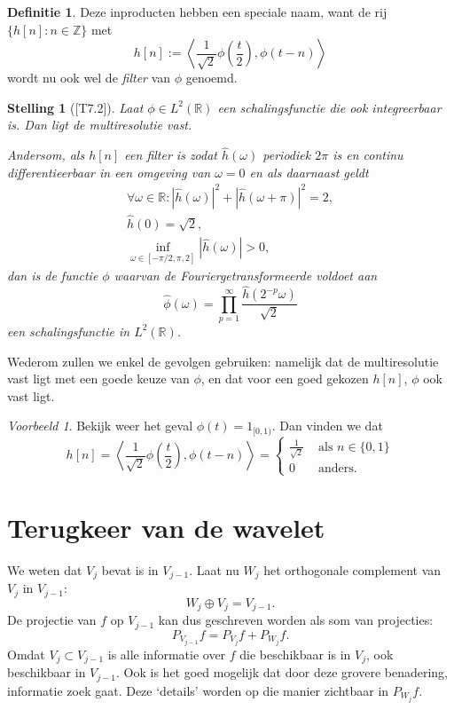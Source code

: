 \documentclass[11pt]{report}
\theoremstyle{plain}
\newtheorem{stelling}{Stelling}
\theoremstyle{definition}
\newtheorem{definitie}{Definitie}
\theoremstyle{remark}
\newtheorem*{voorbeeld}{Voorbeeld}
\newcommand{\R}{\mathbb{R}}
\newcommand{\Z}{\mathbb{Z}}
\begin{document}
\begin{definitie}
Deze inproducten hebben een speciale naam, want de rij $\{h[n]: n \in \Z\}$ met
\[
  h[n] := \left\langle \frac{1}{\sqrt{2}} \phi\left(\frac{t}{2}\right), \phi(t-n) \right\rangle
\]
wordt nu ook wel de \emph{filter} van $\phi$ genoemd.
\end{definitie}
\begin{stelling}[{\cite{mallat}[T7.2]}]
  \label{filter}
  Laat $\phi \in L^2(\R)$ een schalingsfunctie die ook integreerbaar is. Dan ligt de multiresolutie vast.

  Andersom, als $h[n]$ een filter is zodat $\hat{h}(\omega)$ periodiek $2\pi$ is en continu differentieerbaar in een omgeving van $\omega = 0$ en als daarnaast geldt
  \begin{align*}
    \forall \omega \in \R: | \hat{h}(\omega)|^2 + |\hat{h}(\omega + \pi)|^2 = 2, \\
    \hat{h}(0) = \sqrt{2}, \\
    \inf_{\omega \in [-\pi/2, \pi,2]} |\hat{h}(\omega)| > 0,
  \end{align*}
  dan is de functie $\phi$ waarvan de Fouriergetransformeerde voldoet aan
  \[
    \hat{\phi}(\omega) = \prod_{p=1}^\infty \frac{\hat{h}(2^{-p}\omega)}{\sqrt{2}}
  \]
  een schalingsfunctie in $L^2(\R)$.
\end{stelling}
Wederom zullen we enkel de gevolgen gebruiken: namelijk dat de multiresolutie vast ligt met een goede keuze van $\phi$, en dat voor een goed gekozen $h[n]$, $\phi$ ook vast ligt.

\begin{voorbeeld}
Bekijk weer het geval $\phi(t) = 1_{[0,1)}$. Dan vinden we dat
\[
  h[n] = \left\langle \frac{1}{\sqrt{2}} \phi\left(\frac{t}{2}\right), \phi(t-n) \right\rangle = \begin{cases} \frac{1}{\sqrt{2}} & \text{ als } n \in \{0,1\} \\ 0 & \text{ anders.} \end{cases}
\]
\end{voorbeeld}

\section{Terugkeer van de wavelet}
We weten dat $V_j$ bevat is in $V_{j-1}$. Laat nu $W_j$ het orthogonale complement van $V_j$ in $V_{j-1}$:
\[
	W_j \oplus V_j = V_{j-1}.
\]
De projectie van $f$ op $V_{j-1}$ kan dus geschreven worden als som van projecties:
\[
	P_{V_{j-1}} f = P_{V_j} f + P_{W_j} f.
\]
Omdat $V_j \subset V_{j-1}$ is alle informatie over $f$ die beschikbaar is in $V_j$, ook beschikbaar in $V_{j-1}$. Ook is het goed mogelijk dat door deze grovere benadering, informatie zoek gaat. Deze `details' worden op die manier zichtbaar in $P_{W_j} f$.
\end{document}
